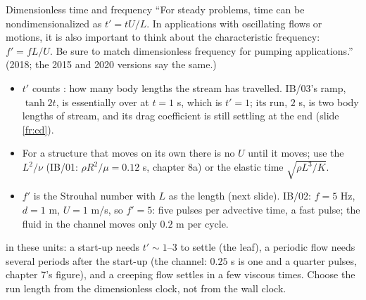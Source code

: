 \documentclass[aspectratio=169,11pt]{beamer}
\begin{document}
\begin{frame}{Dimensionless time and frequency}
\label{fr:time}
\small ``For steady problems, time can be nondimensionalized as $t' = tU/L$. In applications with oscillating flows or motions, it is also important to think about the characteristic frequency: $f' = fL/U$. Be sure to match dimensionless frequency for pumping applications.'' (2018; the 2015 and 2020 versions say the same.)
\begin{itemize}
  \item $t'$ counts : how many body lengths the stream has travelled. IB/03's ramp, $\tanh 2t$, is essentially over at $t = 1$ s, which is $t' = 1$; its run, $2$ s, is two body lengths of stream, and its drag coefficient is still settling at the end (slide \ref{fr:cd}).
  \item For a structure that moves on its own there is no $U$ until it moves; use the  $L^2/\nu$ (IB/01: $\rho R^2/\mu = 0.12$ s, chapter 8a) or the elastic time $\sqrt{\rho L^3/K}$.
  \item $f'$ is the Strouhal number with $L$ as the length (next slide). IB/02: $f = 5$ Hz, $d = 1$ m, $U = 1$ m/s, so $f' = 5$: five pulses per advective time, a fast pulse; the fluid in the channel moves only $0.2$ m per cycle.
\end{itemize}
\vspace{1mm}
\begin{punchbox}
\footnotesize {} in these units: a start-up needs $t' \sim 1$--$3$ to settle (the leaf), a periodic flow needs several periods after the start-up (the channel: $0.25$ s is one and a quarter pulses, chapter 7's figure), and a creeping flow settles in a few viscous times. Choose the run length from the dimensionless clock, not from the wall clock.
\end{punchbox}
\end{frame}
\end{document}
